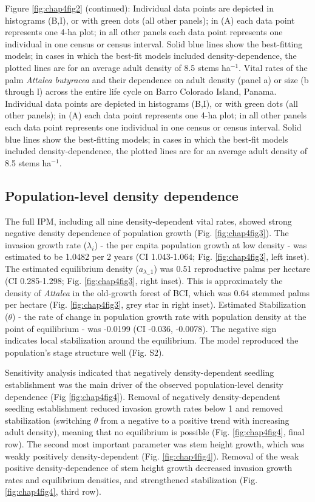 \documentclass[b5paper,justified]{tufte-book} %
\begin{document}
\begin{fullwidth}
\begin{minipage}{14cm}
\small
Figure \ref{fig:chap4fig2} (continued): Individual data points are depicted in histograms (B,I), or with green dots (all other panels); in (A) each data point represents one 4-ha plot; in all other panels each data point represents one individual in one census or census interval.  Solid blue lines show the best-fitting models; in cases in which the best-fit models included density-dependence, the plotted lines are for an average adult density of 8.5 stems ha$^{-1}$. Vital rates of the palm \textit{Attalea butyracea} and their dependence on adult density (panel a) or size (b through l) across the entire life cycle on Barro Colorado Island, Panama. Individual data points are depicted in histograms (B,I), or with green dots (all other panels); in (A) each data point represents one 4-ha plot; in all other panels each data point represents one individual in one census or census interval.  Solid blue lines show the best-fitting models; in cases in which the best-fit models included density-dependence, the plotted lines are for an average adult density of 8.5 stems ha$^{-1}$. \end{minipage}

\subsection{Population-level density dependence} 
The full IPM, including all nine density-dependent vital rates, showed strong negative density dependence of population growth (Fig. \ref{fig:chap4fig3}). The invasion growth rate ($\lambda_i$) - the per capita population growth at low density - was estimated to be 1.0482 per 2 years (CI 1.043-1.064; Fig. \ref{fig:chap4fig3}, left inset). The estimated equilibrium density ($a_{\lambda_=1}$) was 0.51 reproductive palms per hectare (CI 0.285-1.298; Fig. \ref{fig:chap4fig3}, right inset). This is approximately the density of \textit{Attalea} in the old-growth forest of BCI, which was 0.64 stemmed palms per hectare (Fig. \ref{fig:chap4fig3}, grey star in right inset). Estimated Stabilization ($\theta$) - the rate of change in population growth rate with population density at the point of equilibrium - was -0.0199 (CI -0.036, -0.0078). The negative sign indicates local stabilization around the equilibrium.  The model reproduced the population's stage structure well (Fig. S2). 

Sensitivity analysis indicated that negatively density-dependent seedling establishment was the main driver of the observed population-level density dependence (Fig \ref{fig:chap4fig4}). Removal of negatively density-dependent seedling establishment reduced invasion growth rates below 1 and removed stabilization (switching $\theta$ from a negative to a positive trend with increasing adult density), meaning that no equilibrium is possible (Fig. \ref{fig:chap4fig4}, final row).   The second most important parameter was stem height growth, which was weakly positively density-dependent (Fig. \ref{fig:chap4fig4}). Removal of the weak positive density-dependence of stem height growth decreased invasion growth rates and equilibrium densities, and strengthened stabilization (Fig. \ref{fig:chap4fig4}, third row). 



\end{fullwidth}
\end{document}
